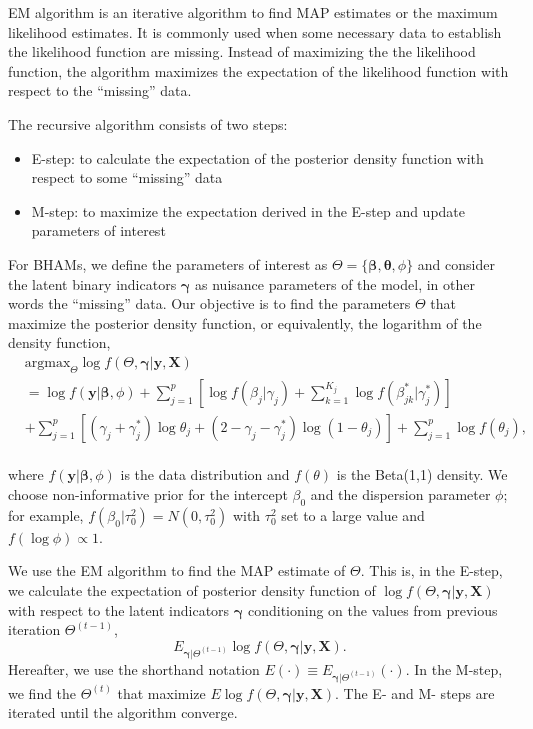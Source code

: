 \documentclass[AMA,STIX1COL,]{WileyNJD-v2}
\providecommand{\tightlist}{%
  \setlength{\itemsep}{0pt}\setlength{\parskip}{0pt}}
\begin{document}
EM algorithm is an iterative algorithm to find MAP estimates or the
maximum likelihood estimates. It is commonly used when some necessary
data to establish the likelihood function are missing. Instead of
maximizing the the likelihood function, the algorithm maximizes the
expectation of the likelihood function with respect to the ``missing''
data.

The recursive algorithm consists of two steps:

\begin{itemize}
\tightlist
\item
  E-step: to calculate the expectation of the posterior density function
  with respect to some ``missing'' data
\item
  M-step: to maximize the expectation derived in the E-step and update
  parameters of interest
\end{itemize}

For BHAMs, we define the parameters of interest as
\(\Theta = \{\boldsymbol{\beta}, \boldsymbol{\theta}, \phi\}\) and
consider the latent binary indicators \(\boldsymbol{\gamma}\) as
nuisance parameters of the model, in other words the ``missing'' data.
Our objective is to find the parameters \(\Theta\) that maximize the
posterior density function, or equivalently, the logarithm of the
density function, \[
\begin{aligned}
& \text{argmax}_{\Theta}
\log f(\Theta, \boldsymbol{\gamma}| \textbf{y}, \textbf{X}) \\
&= \log f(\textbf{y}|\boldsymbol{\beta}, \phi) + \sum\limits_{j=1}^p\left[\log f(\beta_j|\gamma_j)+\sum\limits_{k=1}^{K_j} \log f(\beta^{*}_{jk}|\gamma^{*}_{j})\right]\\
& +\sum\limits_{j=1}^{p} \left[ (\gamma_j+\gamma_{j}^{*})\log \theta_j + (2-\gamma_j-\gamma_{j}^{*}) \log (1-\theta_j)\right] +  \sum\limits_{j=1}^{p}\log f(\theta_j),
\end{aligned}
\]\\
where \(f(\textbf{y}|\boldsymbol{\beta}, \phi)\) is the data
distribution and \(f(\theta)\) is the Beta(1,1) density. We choose
non-informative prior for the intercept \(\beta_0\) and the dispersion
parameter \(\phi\); for example, \(f(\beta_0|\tau_0^2)=N(0,\tau_0^2)\)
with \(\tau^2_0\) set to a large value and \(f(\log \phi) \propto 1\).

We use the EM algorithm to find the MAP estimate of \(\Theta\). This is,
in the E-step, we calculate the expectation of posterior density
function of
\(\log f(\Theta, \boldsymbol{\gamma}| \textbf{y}, \textbf{X})\) with
respect to the latent indicators \(\boldsymbol{\gamma}\) conditioning on
the values from previous iteration \(\Theta^{(t-1)}\), \[
E_{\boldsymbol{\gamma}|\Theta^{(t-1)}}\log f(\Theta, \boldsymbol{\gamma}| \textbf{y}, \textbf{X}) .
\] Hereafter, we use the shorthand notation
\(E(\cdot)\equiv E_{\boldsymbol{\gamma}|\Theta^{(t-1)}}(\cdot)\). In the
M-step, we find the \(\Theta^{(t)}\) that maximize
\(E\log f(\Theta, \boldsymbol{\gamma}| \textbf{y}, \textbf{X})\). The E-
and M- steps are iterated until the algorithm converge.
\end{document}
